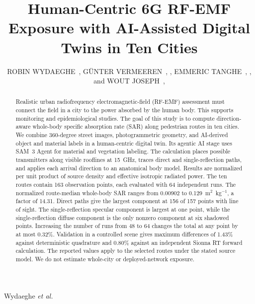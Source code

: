 \documentclass{IEEEoj}
\begin{document}

\title{Human-Centric 6G RF-EMF Exposure with AI-Assisted Digital Twins in Ten Cities}

\author{ROBIN WYDAEGHE~,
G\"UNTER VERMEEREN~,
,
EMMERIC TANGHE~,
,
and WOUT JOSEPH~,
}



{Wydaeghe \textit{et al.}}

\begin{abstract}
Realistic urban radiofrequency electromagnetic-field (RF-EMF) assessment must
connect the field in a city to the power absorbed by the human body. This
supports monitoring and epidemiological studies. The goal of
this study is to compute direction-aware whole-body specific absorption rate
(SAR) along pedestrian routes in ten cities. We combine 360-degree street
images, photogrammetric geometry, and AI-derived object and material labels in
a human-centric digital twin. Its agentic AI stage uses SAM~3 Agent for
material and vegetation labeling. The calculation places possible transmitters
along visible rooflines at 15~GHz, traces direct and single-reflection paths,
and applies each arrival direction to an anatomical body model. Results are
normalized per unit product of source density and effective isotropic radiated
power. The ten routes contain 163 observation points, each evaluated with 64
independent runs. The normalized route-median whole-body SAR ranges from
0.00902 to 0.129~m$^2$~kg$^{-1}$, a factor of 14.31. Direct paths give the
largest component at 156 of 157 points with line of sight. The single-reflection
specular component is largest at one point, while the single-reflection diffuse component is
the only nonzero component at six shadowed points. Increasing the number of
runs from 48 to 64 changes the total at any point by at most 0.32\%. Validation
in a controlled scene gives maximum differences of 1.43\% against deterministic
quadrature and 0.80\% against an independent Sionna RT forward calculation.
The reported values apply to the selected routes under the stated source model.
We do not estimate whole-city or deployed-network exposure.
\end{abstract}
\end{document}
